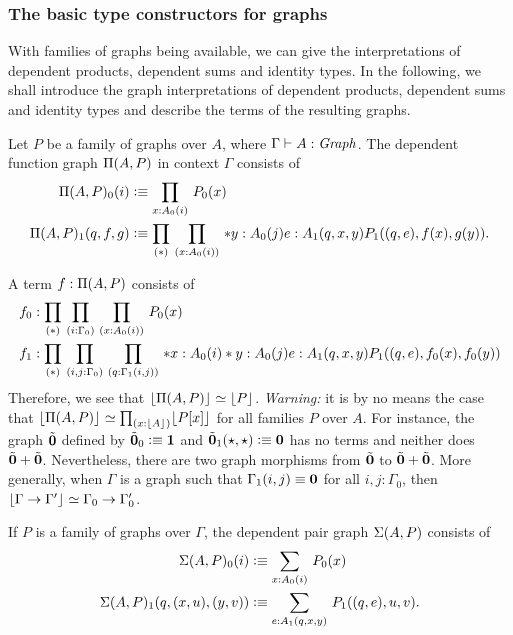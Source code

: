\subsubsection{The basic type constructors for graphs}
With families of graphs being available, we can give the interpretations of
dependent products, dependent sums and identity types. In the following, we
shall introduce the graph interpretations of dependent products, dependent
sums and identity types and describe the terms of the resulting graphs.

\begin{defn}
Let $P$ be a family of graphs over $A$, where $\Gamma\vdash A:\mathit{Graph}$. 
The dependent function graph $\Pi(A,P)$ in context $\Gamma$ consists of
\begin{align*}
\mprd{A}{P}_0(i) & \defeq \prd{x:A_0(i)}P_0(x)\\
\mprd{A}{P}_1(q,f,g) & \defeq \prd*{x:A_0(i)}*{y:A_0(j)}{e:A_1(q,x,y)}P_1(\pairr{q,e},f(x),g(y)).
\end{align*}
\end{defn}

\begin{rmk}
A term $f:\Pi(A,P)$ consists of
\begin{align*}
f_0 & : \prd*{i:\Gamma_0}{x:A_0(i)}P_0(x)\\
f_1 & : \prd*{i,j:\Gamma_0}{q:\Gamma_1(i,j)}*{x:A_0(i)}*{y:A_0(j)}{e:A_1(q,x,y)}P_1(\pairr{q,e},f_0(x),f_0(y))
\end{align*}
Therefore, we see that $\lfloor \Pi(A,P) \rfloor^{} \simeq \lfloor P \rfloor^{}$. \emph{Warning:} it
is by no means the case that $\eqv{\terms{\mprd{A}{P}}}{\prd{x:\terms{A}}
\terms{\subst{x}{P}}}$ for all families $P$ over $A$. For instance, the graph
$\tilde{\mathbf{0}}$ defined by $\tilde{\mathbf{0}}_0\vcentcolon\equiv\mathbf{1}$ and 
$\tilde{\mathbf{0}}_1(\star,\star)\vcentcolon\equiv\mathbf{0}$ has no terms and neither does
$\tilde{\mathbf{0}}+\tilde{\mathbf{0}}$. Nevertheless, there are two graph morphisms
from $\tilde{\mathbf{0}}$ to $\tilde{\mathbf{0}}+\tilde{\mathbf{0}}$. More generally,
when $\Gamma$ is a graph such that $\Gamma_1(i,j)\equiv\mathbf{0}$ for all $i,j:\Gamma_0$,
then ${\lfloor \Gamma\to\Gamma' \rfloor^{}} \simeq \Gamma_0\to\Gamma^\prime_0$.
\end{rmk}

\begin{defn}
If $P$ is a family of graphs over $\Gamma$, the dependent pair graph
$\Sigma(A,P)$ consists of
\begin{align*}
\msm{A}{P}_0(i) & \defeq \sm{x:A_0(i)}P_0(x)\\
\msm{A}{P}_1(q,\pairr{x,u},\pairr{y,v}) & \defeq \sm{e:A_1(q,x,y)}P_1(\pairr{q,e},u,v).
\end{align*}
\end{defn}

